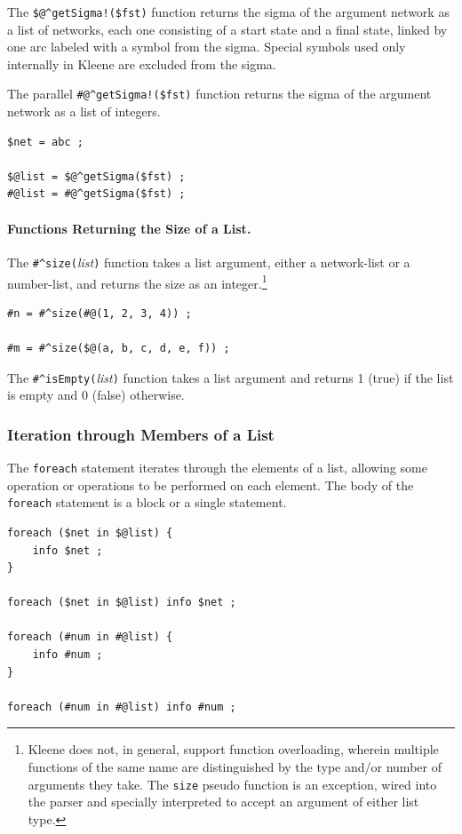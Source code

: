 \documentclass[letterpaper,12pt]{article}
\begin{document}
The \verb+$@^getSigma!($fst)+ function returns the sigma of the argument
network as a list of networks, each one consisting of a start state and a final
state, linked by one arc labeled with a symbol from the sigma.  Special symbols
used only internally in Kleene are excluded from the sigma.

The parallel \verb+#@^getSigma!($fst)+ function returns the sigma of the argument
network as a list of integers.

\begin{Verbatim}[fontsize=\small]
$net = abc ;

$@list = $@^getSigma($fst) ;
#@list = #@^getSigma($fst) ;
\end{Verbatim}

\paragraph{Functions Returning the Size of a List.}

The \verb+#^size(+\textit{list}\verb!)! function takes a list argument,
either a network-list or a number-list, and returns the
size as an integer.\footnote{Kleene does not, in general, support function
overloading, wherein multiple functions of the same name are distinguished
by the type and/or number of arguments they take.
The \texttt{size} pseudo function is an exception,
wired into the parser and specially interpreted to accept an argument of either list
type.}

\begin{Verbatim}[fontsize=\small]
#n = #^size(#@(1, 2, 3, 4)) ;

#m = #^size($@(a, b, c, d, e, f)) ;
\end{Verbatim}

The \verb!#^isEmpty(!\emph{list}\verb!)! function takes a list argument and
returns 1 (true) if the list is empty and 0 (false) otherwise.

\subsubsection{Iteration through Members of a List}


The \texttt{foreach} statement iterates through the elements of a list, allowing
some operation or operations to be performed on each element.  The body of
the \texttt{foreach} statement is a block or a single statement.

\begin{Verbatim}[fontsize=\small]
foreach ($net in $@list) {
    info $net ;
}

foreach ($net in $@list) info $net ;

foreach (#num in #@list) {
    info #num ;
}

foreach (#num in #@list) info #num ;
\end{Verbatim}
\end{document}
